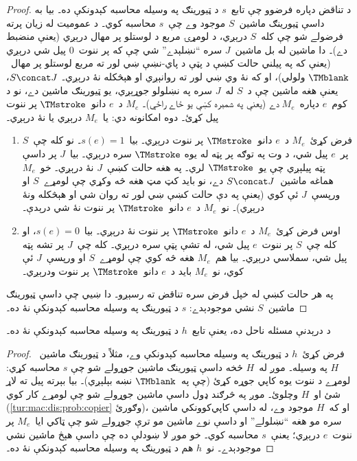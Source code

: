 \documentclass[../../../include/open-logic-section]{subfiles}
\begin{document}
\begin{proof}
د تناقض دپاره فرضوو چې تابع~$s$ د ټيورينګ په وسيله محاسبه کېدونکې
ده۔ بيا به داسې ټيورينګ ماشين~$S$ موجود وے چې~$s$ محاسبه کوي۔ د
عموميت له زيان پرته فرضولے شو چې کله~$S$ درېږي، د لومړۍ مربع د
لوستلو پر مهال درېږي (يعنې منضبط دے)۔ دا ماشين له بل ماشين~$J$ سره
``نښلېدے'' شي چې که پر ننوت~$0$ پيل شي درېږي (يعنې که په پيلني
حالت کښې د پټې د پاي-نښې ښي لور ته مربع لوستلو پر مهال~$\TMblank$
ولولي)، او که نۀ وي ښي لور ته روانېږي او هېڅکله نۀ درېږي۔
$S \concat J$، يعنې هغه ماشين چې د~$S$ له~$J$ سره په نښلولو جوړېږي،
يو ټيورينګ ماشين دے، نو د کوم~$e$ دپاره~$M_e$ دے (يعنې په شمېره کښې
يو ځاے راځي)۔ $M_e$ د~$e$ دانو~$\TMstroke$ پر ننوت پيل کړئ۔ دوه
امکانونه دي: يا~$M_e$ درېږي يا نۀ درېږي۔
\begin{enumerate}
\item فرض کړئ~$M_e$ د~$e$ دانو~$\TMstroke$ پر ننوت درېږي۔ بيا~$s(e)
  = 1$۔ نو کله چې~$S$ پر~$e$ پيل شي، د وت په توګه پر پټه له يوه
  $\TMstroke$ سره درېږي۔ بيا~$J$ پر داسې پټه پيلېږي چې يو~$\TMstroke$
  لري۔ په هغه حالت کښې~$J$ نۀ درېږي۔ خو~$M_e$ هماغه ماشين~$S
  \concat J$ دے، نو بايد کټ مټ هغه څه وکړي چې لومړے~$S$ او ورپسې~$J$
  ئې کوي (يعنې په دې حالت کښې ښي لور ته روان شي او هېڅکله ونۀ درېږي)۔
  نو~$M_e$ د~$e$ دانو~$\TMstroke$ پر ننوت نۀ شي درېدې۔

\item اوس فرض کړئ~$M_e$ د~$e$ دانو~$\TMstroke$ پر ننوت نۀ درېږي۔
  بيا~$s(e) = 0$، او کله چې~$S$ پر ننوت~$e$ پيل شي، له تشې پټې سره
  درېږي۔ کله چې~$J$ پر تشه پټه پيل شي، سملاسي درېږي۔ بيا هم~$M_e$
  هغه څه کوي چې لومړے~$S$ او ورپسې~$J$ ئې کوي، نو~$M_e$ بايد د~$e$
  دانو~$\TMstroke$ پر ننوت ودرېږي۔
\end{enumerate}
په هر حالت کښې له خپل فرض سره تناقض ته رسېږو۔ دا ښيي چې داسې ټيورينګ
ماشين~$S$ نشي موجودېدے: $s$ د ټيورينګ په وسيله محاسبه کېدونکې نۀ
ده۔
\end{proof}

\begin{thm}
 د درېدنې مسئله ناحل ده، يعنې تابع~$h$
د ټيورينګ په وسيله محاسبه کېدونکې نۀ ده۔
\end{thm}

\begin{proof}
فرض کړئ~$h$ د ټيورينګ په وسيله محاسبه کېدونکې وے، مثلاً د ټيورينګ
ماشين~$H$ په وسيله۔ موږ له~$H$ څخه داسې ټيورينګ ماشين جوړولے شو چې
$s$ محاسبه کړي: لومړے د ننوت يوه کاپي جوړه کړئ (چې په~$\TMblank$
نښه بېلېږي)۔ بيا بېرته پيل ته لاړ شئ او~$H$ وچلوئ۔ موږ په څرګند ډول
داسې ماشين جوړولے شو چې لومړے کار کوي
(\cref{tur:mac:dis:prob:copier} وګورئ)، او که~$H$ موجود وے، له داسې
کاپي‌کوونکي ماشين سره مو هغه ``نښلولے'' او داسې نوے ماشين مو ترې
جوړولے شو چې ټاکي ايا~$M_e$ پر ننوت~$e$ درېږي؛ يعنې~$s$ محاسبه کوي۔
خو موږ لا ښودلې ده چې داسې هېڅ ماشين نشي موجودېدے۔ نو~$h$ هم د
ټيورينګ په وسيله محاسبه کېدونکې نۀ ده۔
\end{proof}
\end{document}

